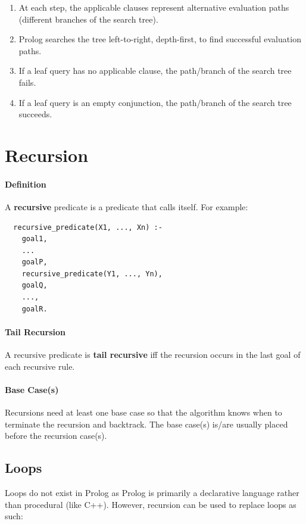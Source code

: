 \documentclass{article}
\begin{document}
\begin{multicols}{2}
  \begin{enumerate}
  \item At each step, the applicable clauses represent alternative evaluation paths (different branches of the search tree).
  \item Prolog searches the tree left-to-right, depth-first, to find successful evaluation paths.
  \item If a leaf query has no applicable clause, the path/branch of the search tree fails.
  \item If a leaf query is an empty conjunction, the path/branch of the search tree succeeds.
  \end{enumerate}
  
  \section{Recursion}
  
  \paragraph{Definition} A {\bf recursive} predicate is a predicate that calls itself. For example:
  
  \begin{lstlisting}
  recursive_predicate(X1, ..., Xn) :-
    goal1,
    ...
    goalP,
    recursive_predicate(Y1, ..., Yn),
    goalQ,
    ...,
    goalR.
  \end{lstlisting}
  
  \paragraph{Tail Recursion} A recursive predicate is {\bf tail recursive} iff the recursion occurs in the last goal of each recursive rule. 
  
  \paragraph{Base Case(s)} Recursions need at least one base case so that the algorithm knows when to terminate the recursion and backtrack. The base case(s) is/are usually placed before the recursion case(s).
  
  \subsection{Loops}
  
  Loops do not exist in Prolog as Prolog is primarily a declarative language rather than procedural (like C++). However, recursion can be used to replace loops as such:
  

\end{multicols}
\end{document}
